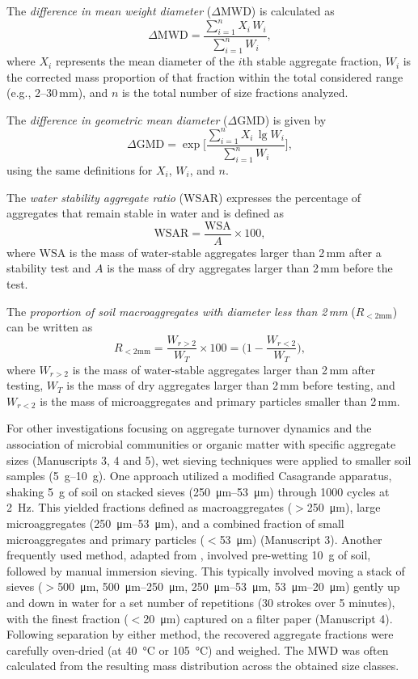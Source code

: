The \emph{difference in mean weight diameter} ($\Delta\mathrm{MWD}$) is calculated as
\[
\Delta\mathrm{MWD} = \frac{\sum_{i=1}^{n} X_i\,W_i}{\sum_{i=1}^{n} W_i},
\]
where $X_i$ represents the mean diameter of the $i$th stable aggregate fraction, $W_i$ is the corrected mass proportion of that fraction within the total considered range (e.g., 2--30\,mm), and $n$ is the total number of size fractions analyzed.

The \emph{difference in geometric mean diameter} ($\Delta\mathrm{GMD}$) is given by
\[
\Delta\mathrm{GMD} = \exp\!\biggl[\frac{\sum_{i=1}^{n} X_i\,\lg W_i}{\sum_{i=1}^{n} W_i}\biggr],
\]
using the same definitions for $X_i$, $W_i$, and $n$.

The \emph{water stability aggregate ratio} (WSAR) expresses the percentage of aggregates that remain stable in water and is defined as
\[
\mathrm{WSAR} = \frac{\mathrm{WSA}}{A}\times100,
\]
where $\mathrm{WSA}$ is the mass of water-stable aggregates larger than 2\,mm after a stability test and $A$ is the mass of dry aggregates larger than 2\,mm before the test.

The \emph{proportion of soil macroaggregates with diameter less than 2\,mm} ($R_{<2\mathrm{mm}}$) can be written as
\[
R_{<2\mathrm{mm}} = \frac{W_{r>2}}{W_T}\times100 = \biggl(1-\frac{W_{r<2}}{W_T}\biggr),
\]
where $W_{r>2}$ is the mass of water-stable aggregates larger than 2\,mm after testing, $W_T$ is the mass of dry aggregates larger than 2\,mm before testing, and $W_{r<2}$ is the mass of microaggregates and primary particles smaller than 2\,mm.

For other investigations focusing on aggregate turnover dynamics and the association of microbial communities or organic matter with specific aggregate sizes (Manuscripts 3, 4 and 5), wet sieving techniques were applied to smaller soil samples (\SIrange{5}{10}{\gram}). One approach utilized a modified Casagrande apparatus, shaking \SI{5}{\gram} of soil on stacked sieves (\SIrange{250}{53}{\micro\metre}) through 1000 cycles at \SI{2}{\hertz}. This yielded fractions defined as macroaggregates ($>$\SI{250}{\micro\metre}), large microaggregates (\SIrange[range-phrase=--,range-units=single]{250}{53}{\micro\metre}), and a combined fraction of small microaggregates and primary particles ($<$\SI{53}{\micro\metre}) (Manuscript 3). Another frequently used method, adapted from \citet{Elliott1986}, involved pre-wetting \SI{10}{\gram} of soil, followed by manual immersion sieving. This typically involved moving a stack of sieves ($>$\SI{500}{\micro\metre}, \SIrange[range-phrase=--]{500}{250}{\micro\metre}, \SIrange[range-phrase=--,range-units=single]{250}{53}{\micro\metre}, \SIrange[range-phrase=--,range-units=single]{53}{20}{\micro\metre}) gently up and down in water for a set number of repetitions (30 strokes over 5 minutes), with the finest fraction ($<$\SI{20}{\micro\metre}) captured on a filter paper (Manuscript 4). Following separation by either method, the recovered aggregate fractions were carefully oven-dried (at \SI{40}{\degreeCelsius} or \SI{105}{\degreeCelsius}) and weighed. The MWD was often calculated from the resulting mass distribution across the obtained size classes.

